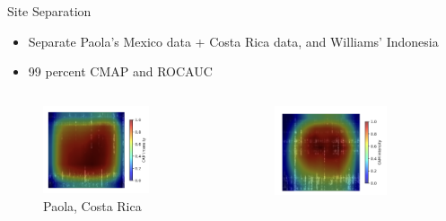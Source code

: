 \begin{frame}{Site Separation}
    \begin{itemize}
        \item Separate Paola's Mexico data + Costa Rica data, and Williams' Indonesia
        \item 99 percent CMAP and ROCAUC
    \end{itemize}
    \begin{columns}
        \begin{column}{0.32\textwidth}
            \begin{figure}
                \centering
                \includegraphics[height=0.5\textheight,width=0.75\textwidth,keepaspectratio]{images/PaolaCostaRicaNonDegraded.png}
                \caption{Paola, Costa Rica}
            \end{figure}
        \end{column}
        \begin{column}{0.32\textwidth}
            \begin{figure}
                \centering
                \includegraphics[height=0.5\textheight,width=0.75\textwidth,keepaspectratio]{images/PaolaMexicoNonDegraded.png}

\end{figure}
\end{column}
\end{columns}
\end{frame}
